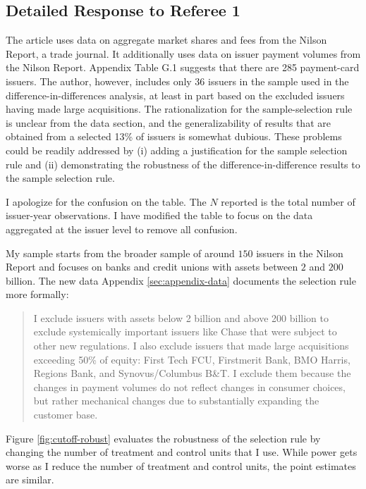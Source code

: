 \documentclass[main.tex]{subfiles}
\begin{document}
\begin{refsection}
\section*{Detailed Response to Referee 1}

\begin{refcommentnoclear}
    The article uses data on aggregate market shares and fees from the Nilson Report, a trade journal.
It additionally uses data on issuer payment volumes from the Nilson Report.
Appendix Table G.1 suggests that there are 285 payment-card issuers.
The author, however, includes only 36 issuers in the sample used in the difference-in-differences analysis, at least in part based on the excluded issuers having made large acquisitions.
The rationalization for the sample-selection rule is unclear from the data section, and the generalizability of results that are obtained from a selected 13\% of issuers is somewhat dubious.
These problems could be readily addressed by (i) adding a justification for the sample selection rule and (ii) demonstrating the robustness of the difference-in-difference results to the sample selection rule.
\end{refcommentnoclear}

I apologize for the confusion on the table.
The $N$ reported is the total number of issuer-year observations.
I have modified the table to focus on the data aggregated at the issuer level to remove all confusion.

My sample starts from the broader sample of around $150$ issuers in the Nilson Report and focuses on banks and credit unions with assets between $2$ and $200$ billion.
The new data Appendix \ref{sec:appendix-data} documents the selection rule more formally:
\begin{quotation}
    I exclude issuers with assets below 2 billion and above 200 billion to exclude systemically important issuers like Chase that were subject to other new regulations.
I also exclude issuers that made large acquisitions exceeding 50\% of equity: First Tech FCU, Firstmerit Bank, BMO Harris, Regions Bank, and Synovus/Columbus B\&T.
I exclude them because the changes in payment volumes do not reflect changes in consumer choices, but rather mechanical changes due to substantially expanding the customer base.
\end{quotation}

Figure \ref{fig:cutoff-robust} evaluates the robustness of the selection rule by changing the number of treatment and control units that I use.
While power gets worse as I reduce the number of treatment and control units, the point estimates are similar.


\end{refsection}
\end{document}
